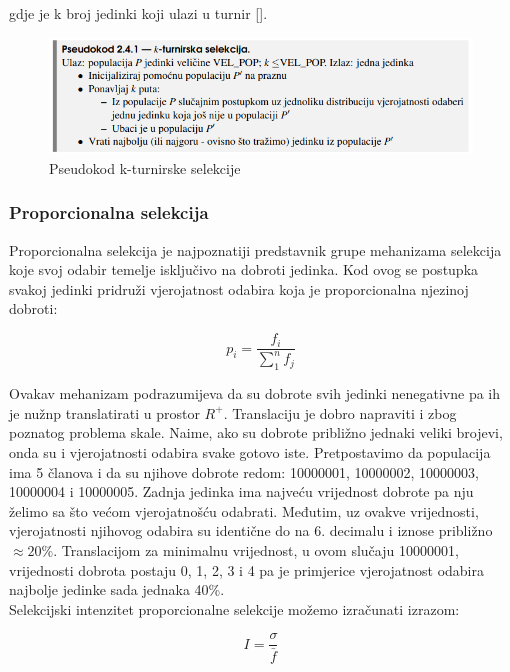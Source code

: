 \documentclass[times, utf8, zavrsni]{fer}
\begin{document}
gdje je k broj jedinki koji ulazi u turnir [\citep{Back1995}]. 

\begin{figure}[!htb]
	\centering
	\includegraphics[width=15cm]{slike/kTourSelect.png}
	\caption{Pseudokod k-turnirske selekcije}
	\label{fig:k-tour-select}
\end{figure}


\subsubsection{Proporcionalna selekcija}
Proporcionalna selekcija je najpoznatiji predstavnik grupe mehanizama selekcija koje svoj odabir temelje isključivo na dobroti jedinka. Kod ovog se postupka svakoj jedinki pridruži vjerojatnost odabira koja je proporcionalna njezinoj dobroti:

\begin{equation}
	p_i=\frac{f_i}{\sum_{1}^{n}f_j}
\end{equation}

Ovakav mehanizam podrazumijeva da su dobrote svih jedinki nenegativne pa ih je nužnp translatirati u prostor $R^+$. Translaciju je dobro napraviti i zbog poznatog problema skale. Naime, ako su dobrote približno jednaki veliki brojevi, onda su i vjerojatnosti odabira svake gotovo iste. Pretpostavimo da populacija ima 5 članova i da su njihove dobrote redom: 10000001, 10000002, 10000003, 10000004 i 10000005. Zadnja jedinka ima najveću vrijednost dobrote pa nju želimo sa što većom vjerojatnošću odabrati. Međutim, uz ovakve vrijednosti, vjerojatnosti njihovog odabira su identične do na 6. decimalu i iznose približno $\approx20\%$.  Translacijom za minimalnu vrijednost, u ovom slučaju 10000001, vrijednosti dobrota postaju 0, 1, 2, 3 i 4 pa je primjerice vjerojatnost odabira najbolje jedinke sada jednaka 40\%. \\
Selekcijski intenzitet proporcionalne selekcije možemo izračunati izrazom:

\begin{equation}
	I=\frac{\sigma}{\bar{f}}
\end{equation}
\end{document}
